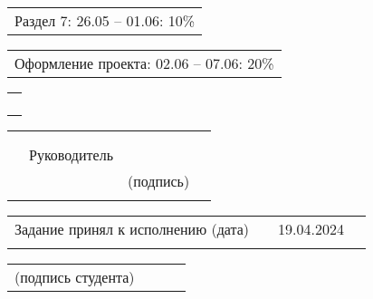 \documentclass[12pt, А4, twoside]{article}
\begin{document}
\begin{FlushLeft}
    \vspace{-0.1 cm}

    \begin{tabular}{p{17.25cm}}
        \hspace{0.3cm} \textsf{Раздел 7:} \hspace{2.54cm} \textsf{ 26.05 {--} 01.06:} \hspace{0.5cm} \textsf{10\%} \vspace{0pt} \hline \\
    \end{tabular}

    \vspace{-0.1 cm}

    \begin{tabular}{p{17.25cm}}
        \hspace{0.3cm} \textsf{Оформление проекта:} \hspace{0.5cm} \textsf{ 02.06 {--} 07.06:} \hspace{0.5cm} \textsf{20\%} \vspace{0pt} \hline \\
    \end{tabular}

    \begin{tabular}{p{17.25cm}}
        \vspace{0pt} \hline \\
        \vspace{0pt} \hline \\
        \vspace{0pt} \hline \\
        \vspace{0pt} \hline \\
    \end{tabular}

    \begin{tabular}{p{4.2cm} p{3.8cm} p{6.0cm} p{2.0cm}}
        & & &
        \\
        & & &
        \\
        & \fontsize{14}{17.5} \textsf{Руководитель} &
        \vspace{0pt} \hline &
        \\
        & & \centering \fontsize{12}{15} \textsf{(подпись)} &
        \\
        & & &
    \end{tabular}

\fontsize{12}{15}

    \begin{tabular}{p{7.5cm} p{0.5cm} p{6.0cm} p{2.0cm}}
        \textsf{Задание принял к исполнению (дата)} & &
        \centering \textsf{19.04.2024} \vspace{1pt} \hline &
        \\
        & & &
    \end{tabular}

    \begin{tabular}{p{4.0cm} p{0.2cm} p{9.8cm} p{2.0cm}}
        \textsf{(подпись студента)} & &
        \vspace{0pt} \hline &
        \\ 
    \end{tabular}

\end{FlushLeft}
\end{document}
